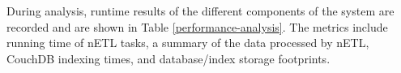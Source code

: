 During analysis, runtime results of the different components of the system are recorded and are shown in Table \ref{performance-analysis}. The metrics include running time of nETL tasks, a summary of the data processed by nETL, CouchDB indexing times, and database/index storage footprints.


